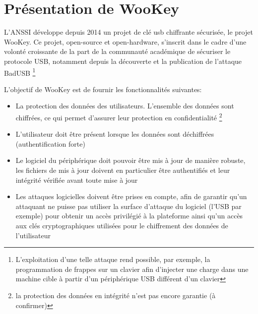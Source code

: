 \section{Présentation de WooKey}\label{WooKey}

L'ANSSI développe depuis 2014 un projet de clé usb chiffrante sécurisée, le projet WooKey. Ce projet, open-source et open-hardware, s'inscrit dans le cadre d'une volonté croissante de la part de la communauté académique de sécuriser le protocole USB, notamment depuis la découverte et la publication de l'attaque BadUSB \footnote{L'exploitation d'une telle attaque rend possible, par exemple, la programmation de frappes sur un clavier afin d'injecter une charge dans une machine cible à partir d'un périphérique USB différent d'un clavier }




L'objectif de WooKey est de fournir les fonctionnalités suivantes:
\begin{itemize}
	\item La protection des données des utilisateurs. L'ensemble des données sont chiffrées, ce qui permet d'assurer leur protection en confidentialité \footnote{la protection des données en intégrité n'est pas encore garantie (à confirmer)}
	\item L'utilisateur doit être présent lorsque les données sont déchiffrées (authentification forte)
	\item Le logiciel du périphérique doit pouvoir être mis à jour de manière robuste, les fichiers de mis à jour doivent en particulier être authentifiés et leur intégrité vérifiée avant toute mise à jour
	\item Les attaques logicielles doivent être prises en compte, afin de garantir qu'un attaquant ne puisse pas utiliser la surface d'attaque du logiciel (l'USB par exemple) pour obtenir un accès privilégié à la plateforme ainsi qu'un accès aux clés cryptographiques utilisées pour le chiffrement des données de l'utilisateur

\end{itemize}

